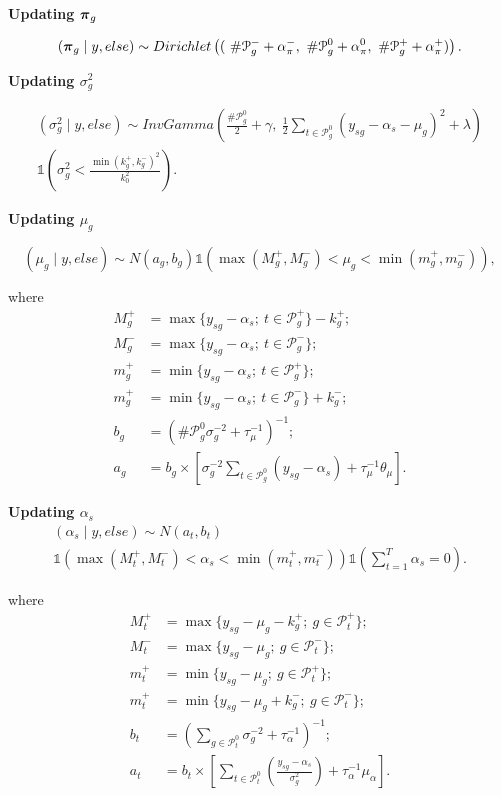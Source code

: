 \textbf{Updating $\mbox{\boldmath $\pi$}_{g}$}

$$(\mbox{\boldmath $\pi$}_g \mid y, else) \sim Dirichlet \left( (\ \#\mathcal{P}^-_g + \alpha^-_{\pi}, \ \#\mathcal{P}^0_g + \alpha^0_{\pi}, \ \#\mathcal{P}^+_g + \alpha^+_{\pi}) \right).$$

\textbf{Updating $\sigma^2_{g}$}

\begin{multline*}
(\sigma^2_g \mid y, else) \sim InvGamma \left( \frac{\#\mathcal{P}^0_g }{2} + \gamma, \ \frac{1}{2} \sum_{t \in \mathcal{P}^0_g } (y_{sg} - \alpha_s - \mu_g)^2 + \lambda\right)\\
\mathds{1}\left( \sigma^2_g < \frac{\min \left( k^+_g, k^-_g\right)^2}{k^2_0} \right).
\end{multline*}

\textbf{Updating $\mu_g$}

$$(\mu_g \mid y, else) \sim N(a_g, b_g) \mathds{1}\left( \max\left(M^+_g, M^-_g\right) < \mu_g < \min\left(m^{+}_g, m^-_g \right)\right),$$ 

where 
\begin{align*}
M^+_g &= \max\{y_{sg} - \alpha_s; \ t \in \mathcal{P}^+_g\} - k^+_g; \\ 
M^-_g &= \max\{y_{sg} - \alpha_s; \ t \in \mathcal{P}^-_g\}; \\ 
m^+_g &= \min\{y_{sg} - \alpha_s; \ t \in \mathcal{P}^+_g\}; \\ 
m^+_g &= \min\{y_{sg} - \alpha_s; \ t \in \mathcal{P}^-_g\} + k^-_g;\\
b_g &= (\#\mathcal{P}^0_g \sigma^{-2}_g + \tau^{-1}_{\mu})^ {-1};\\
a_g &= b_g \times \left[ \sigma^{-2}_g \sum_{t \in \mathcal{P}^0_g}(y_{sg} -\alpha_s ) + \tau^{-1}_{\mu}\theta_{\mu}\right]. 
\end{align*}

\textbf{Updating $\alpha_s$}
\begin{multline*}
(\alpha_s \mid y, else) \sim N( a_t, b_t) \\
\mathds{1}\left( \max\left(M^+_t, M^-_t\right) < \alpha_s < \min\left(m^{+}_t, m^-_t \right)\right)\mathds{1}\left(\sum^T_{t=1} \alpha_s = 0\right).
\end{multline*}

where
\begin{align*}
M^+_t &= \max\{y_{sg} - \mu_g - k^+_g; \ g \in \mathcal{P}^+_t\}; \\ 
M^-_t &= \max\{y_{sg} - \mu_g; \ g \in \mathcal{P}^-_t\}; \\ 
m^+_t &= \min\{y_{sg} - \mu_g; \ g \in \mathcal{P}^+_t\}; \\ 
m^+_t &= \min\{y_{sg} - \mu_g + k^-_g; \ g \in \mathcal{P}^-_t\};\\
b_t &= \left( \sum_{ g \in \mathcal{P}^0_t} \sigma^{-2}_g + \tau^{-1}_{\alpha} \right)^ {-1};\\
a_t &= b_t \times \left[ \sum_{t \in \mathcal{P}^0_t} \left( \frac{y_{sg} -\alpha_s}{\sigma^{2}_g } \right) + \tau^{-1}_{\alpha} \mu_{\alpha}\right]. 
\end{align*}

